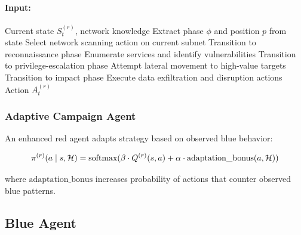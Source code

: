 \documentclass[12pt,oneside]{article}
\begin{document}
\begin{algorithm}
\caption{Deterministic Red Agent Policy}
\begin{algorithmic}[1]
\STATE \paragraph{Input:} Current state $S_t^{(r)}$, network knowledge
\STATE Extract phase $\phi$ and position $p$ from state
    \STATE Select network scanning action on current subnet
        \STATE Transition to reconnaissance phase
    \ENDIF
{}
    \STATE Enumerate services and identify vulnerabilities
        \STATE Transition to privilege-escalation phase
    \ENDIF
{}
    \STATE Attempt lateral movement to high-value targets
        \STATE Transition to impact phase
    \ENDIF
{}
    \STATE Execute data exfiltration and disruption actions
\ENDIF
\RETURN Action $A_t^{(r)}$
\end{algorithmic}
\end{algorithm}

\subsubsection{Adaptive Campaign Agent}
An enhanced red agent adapts strategy based on observed blue behavior:

\begin{equation}
\pi^{(r)}(a \mid s, \mathcal{H}) = \text{softmax}(\beta \cdot Q^{(r)}(s, a) + \alpha \cdot \text{adaptation\_bonus}(a, \mathcal{H}))
\end{equation}

where $\text{adaptation\_bonus}$ increases probability of actions that counter observed blue patterns.

\subsection{Blue Agent}

\end{document}
